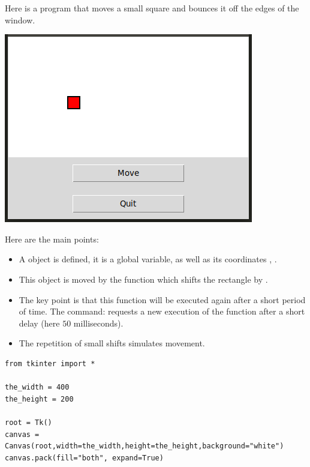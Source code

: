 \documentclass[11pt,class=report,crop=false]{standalone}
\begin{document}
\begin{cours}


Here is a program that moves a small square and bounces it off the edges of the window.

\begin{center}
\includegraphics[scale=\myscale,scale=0.5]{screen-blocks-lesson-move-en}
\end{center}

Here are the main points:
\begin{itemize}
  \item A   object is defined, it is a global variable, as well as its coordinates , .
  
  \item This object is moved by the  function which shifts the rectangle by .
    
  \item The key point is that this function will be executed again after a short period of time. The command: 
  requests a new execution of the  function after a short delay (here $50$ milliseconds).
  
  \item The repetition of small shifts simulates movement.
\end{itemize}

\begin{lstlisting}
from tkinter import *

the_width = 400
the_height = 200

root = Tk()     
canvas = Canvas(root,width=the_width,height=the_height,background="white")
canvas.pack(fill="both", expand=True)


\end{lstlisting}
\end{cours}
\end{document}
